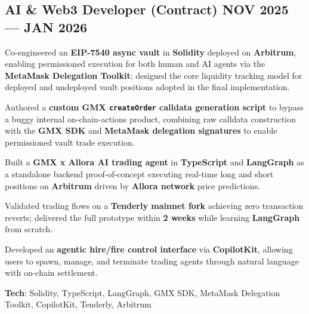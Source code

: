\documentclass[letter,10pt]{article}
\begin{document}
\subsection{{AI \& Web3 Developer (Contract) \hfill NOV 2025 --- JAN 2026}}
\begin{zitemize}
  \item Co-engineered an \textbf{EIP-7540 async vault} in \textbf{Solidity} deployed on \textbf{Arbitrum}, enabling permissioned execution for both human and AI agents via the \textbf{MetaMask Delegation Toolkit}; designed the core liquidity tracking model for deployed and undeployed vault positions adopted in the final implementation.
  \item Authored a \textbf{custom GMX \texttt{createOrder} calldata generation script} to bypass a buggy internal on-chain-actions product, combining raw calldata construction with the \textbf{GMX SDK} and \textbf{MetaMask delegation signatures} to enable permissioned vault trade execution.
  \item Built a \textbf{GMX x Allora AI trading agent} in \textbf{TypeScript} and \textbf{LangGraph} as a standalone backend proof-of-concept executing real-time long and short positions on \textbf{Arbitrum} driven by \textbf{Allora network} price predictions.
  \item Validated trading flows on a \textbf{Tenderly mainnet fork} achieving zero transaction reverts; delivered the full prototype within \textbf{2 weeks} while learning \textbf{LangGraph} from scratch.
  \item Developed an \textbf{agentic hire/fire control interface} via \textbf{CopilotKit}, allowing users to spawn, manage, and terminate trading agents through natural language with on-chain settlement.
  \item \textbf{Tech}: Solidity, TypeScript, LangGraph, GMX SDK, MetaMask Delegation Toolkit, CopilotKit, Tenderly, Arbitrum
\end{zitemize}
\end{document}
